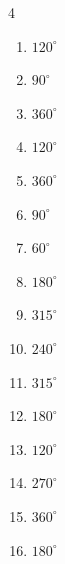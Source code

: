 \begin{multicols}{4}
\begin{enumerate}
  \item $\displaystyle 120^{\circ}$

  \item $\displaystyle 90^{\circ}$

  \item $\displaystyle 360^{\circ}$
        \phantom{$\displaystyle =2\pi$}

  \item $\displaystyle 120^{\circ}$

\columnbreak %

  \item $\displaystyle 360^{\circ}$
        \phantom{$\displaystyle =2\pi$}

  \item $\displaystyle 90^{\circ}$

  \item $\displaystyle 60^{\circ}$

  \item $\displaystyle 180^{\circ}$
        \phantom{$\displaystyle =\pi$}

  \item $\displaystyle 315^{\circ}$

  \item $\displaystyle 240^{\circ}$

  \item $\displaystyle 315^{\circ}$

  \item $\displaystyle 180^{\circ}$
        \phantom{$\displaystyle =\pi$}

  \item $\displaystyle 120^{\circ}$

  \item $\displaystyle 270^{\circ}$

  \item $\displaystyle 360^{\circ}$
        \phantom{$\displaystyle =2\pi$}

  \item $\displaystyle 180^{\circ}$
        \phantom{$\displaystyle =\pi$}


\end{enumerate}
\end{multicols}
